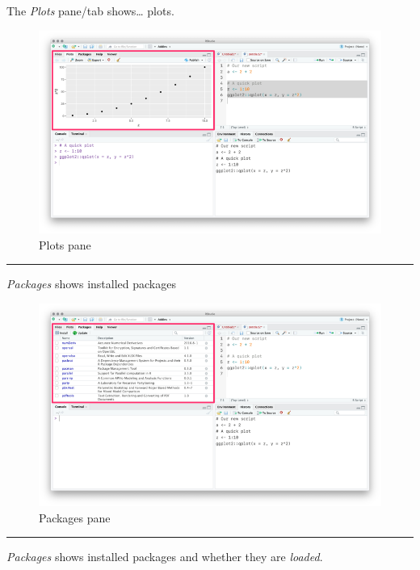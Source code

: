 \documentclass[]{book}
\begin{document}
The \emph{Plots} pane/tab shows\ldots{} plots.

\begin{figure}
\centering
\includegraphics{img/rstudio_plots.png}
\caption{Plots pane}
\end{figure}

\begin{center}\rule{0.5\linewidth}{\linethickness}\end{center}

\emph{Packages} shows installed packages

\begin{figure}
\centering
\includegraphics{img/rstudio_packages.png}
\caption{Packages pane}
\end{figure}

\begin{center}\rule{0.5\linewidth}{\linethickness}\end{center}

\emph{Packages} shows installed packages and whether they are \emph{loaded}.
\end{document}
